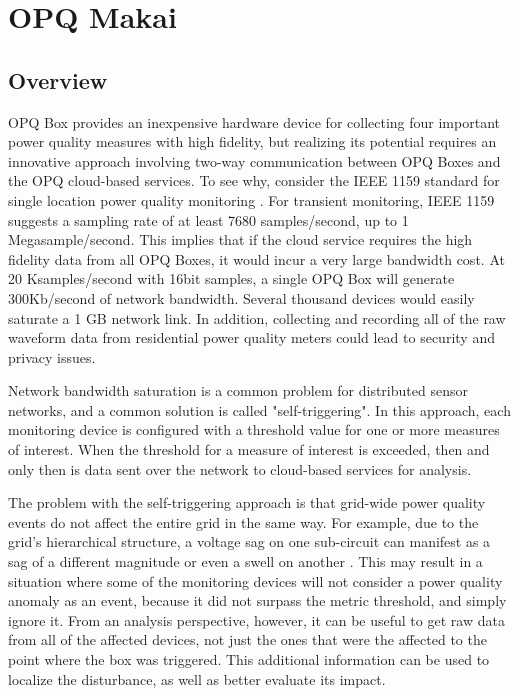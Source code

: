 \section{OPQ Makai}
\label{sec:opq-makai}

\subsection{Overview}

OPQ Box provides an inexpensive hardware device for collecting four important power quality measures with high fidelity, but realizing its potential requires an innovative approach involving two-way communication between OPQ Boxes and the OPQ cloud-based services. To see why, consider the IEEE 1159 standard for single location power quality monitoring \cite{unruh_ieee_2018}.  For transient monitoring, IEEE 1159 suggests a sampling rate of at least 7680 samples/second, up to 1 Megasample/second. This implies that if the cloud service requires the high fidelity data from all OPQ Boxes, it would incur a very large bandwidth cost. At 20 Ksamples/second with 16bit samples, a single OPQ Box will generate 300Kb/second of network bandwidth. Several thousand devices would easily saturate a 1 GB network link. In addition, collecting and recording all of the raw waveform data from residential power quality meters could lead to security and privacy issues.

Network bandwidth saturation is a common problem for distributed sensor networks, and a common solution is called "self-triggering".  In this approach, each monitoring device is configured with a threshold value for one or more measures of interest. When the threshold for a measure of interest is exceeded, then and only then is data sent over the network to cloud-based services for analysis.

The problem with the self-triggering approach is that grid-wide power quality events do not affect the entire grid in the same way. For example, due to the grid’s hierarchical structure, a voltage sag on one sub-circuit can manifest as a sag of a different magnitude or even a swell on another \cite{kahle_power_2015}. This may result in a situation where some of the monitoring devices will not consider a power quality anomaly as an event, because it did not surpass the metric threshold, and simply ignore it. From an analysis perspective, however, it can be useful to get raw data from all of the affected devices, not just the ones that were the affected to the point where the box was triggered. This additional information can be used to localize the disturbance, as well as better evaluate its impact.


